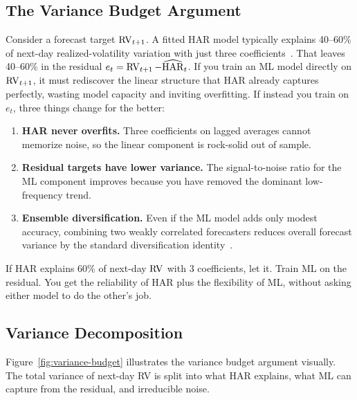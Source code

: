 \subsection{The Variance Budget Argument}

Consider a forecast target $\operatorname{RV}_{t+1}$.  A fitted HAR model typically
explains 40--60\% of next-day realized-volatility variation with just three
coefficients~\citep{RahimikiaPoon2020}.  That leaves 40--60\% in the
residual $e_t = \operatorname{RV}_{t+1} - \widehat{\operatorname{HAR}}_t$.  If you train an ML model
directly on $\operatorname{RV}_{t+1}$, it must rediscover the linear structure that HAR
already captures perfectly, wasting model capacity and inviting overfitting.
If instead you train on $e_t$, three things change for the better:

\begin{enumerate}
  \item \textbf{HAR never overfits.}  Three coefficients on lagged
        averages cannot memorize noise, so the linear component is
        rock-solid out of sample.
  \item \textbf{Residual targets have lower variance.}  The signal-to-noise
        ratio for the ML component improves because you have removed the
        dominant low-frequency trend.
  \item \textbf{Ensemble diversification.}  Even if the ML model adds only
        modest accuracy, combining two weakly correlated forecasters reduces
        overall forecast variance by the standard diversification
        identity~\citep{RahimikiaPoon2020}.
\end{enumerate}

\begin{keyidea}
If HAR explains 60\% of next-day $\operatorname{RV}$ with 3 coefficients, let it.
Train ML on the residual.  You get the reliability of HAR plus the
flexibility of ML, without asking either model to do the other's job.
\end{keyidea}

\subsection{Variance Decomposition}

Figure~\ref{fig:variance-budget} illustrates the variance budget argument
visually.  The total variance of next-day RV is split into what HAR
explains, what ML can capture from the residual, and irreducible noise.

